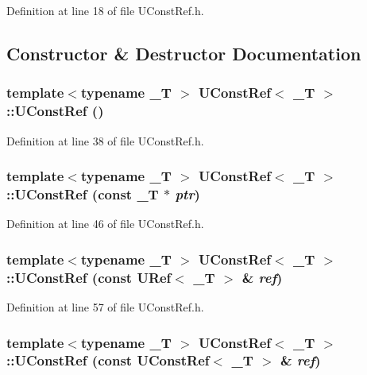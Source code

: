 Definition at line 18 of file UConstRef.h.

\subsection{Constructor \& Destructor Documentation}
\hypertarget{class_u_const_ref_eb44190a6765767081de3a3498fb828c}{
\subsubsection[{UConstRef}]{\setlength{\rightskip}{0pt plus 5cm}template$<$typename \_\-T $>$ {\bf UConstRef}$<$ \_\-T $>$::{\bf UConstRef} ()}}
\label{class_u_const_ref_eb44190a6765767081de3a3498fb828c}




Definition at line 38 of file UConstRef.h.\hypertarget{class_u_const_ref_7d960398014c1b439f612b10aa600632}{
\subsubsection[{UConstRef}]{\setlength{\rightskip}{0pt plus 5cm}template$<$typename \_\-T $>$ {\bf UConstRef}$<$ \_\-T $>$::{\bf UConstRef} (const \_\-T $\ast$ {\em ptr})}}
\label{class_u_const_ref_7d960398014c1b439f612b10aa600632}




Definition at line 46 of file UConstRef.h.\hypertarget{class_u_const_ref_c0437dd725d2f83b6e52dde6e0e91d0a}{
\subsubsection[{UConstRef}]{\setlength{\rightskip}{0pt plus 5cm}template$<$typename \_\-T $>$ {\bf UConstRef}$<$ \_\-T $>$::{\bf UConstRef} (const {\bf URef}$<$ \_\-T $>$ \& {\em ref})}}
\label{class_u_const_ref_c0437dd725d2f83b6e52dde6e0e91d0a}




Definition at line 57 of file UConstRef.h.\hypertarget{class_u_const_ref_b90ff7a4fd8a4a5b74846c36b7c8fc85}{
\subsubsection[{UConstRef}]{\setlength{\rightskip}{0pt plus 5cm}template$<$typename \_\-T $>$ {\bf UConstRef}$<$ \_\-T $>$::{\bf UConstRef} (const {\bf UConstRef}$<$ \_\-T $>$ \& {\em ref})}}
\label{class_u_const_ref_b90ff7a4fd8a4a5b74846c36b7c8fc85}




